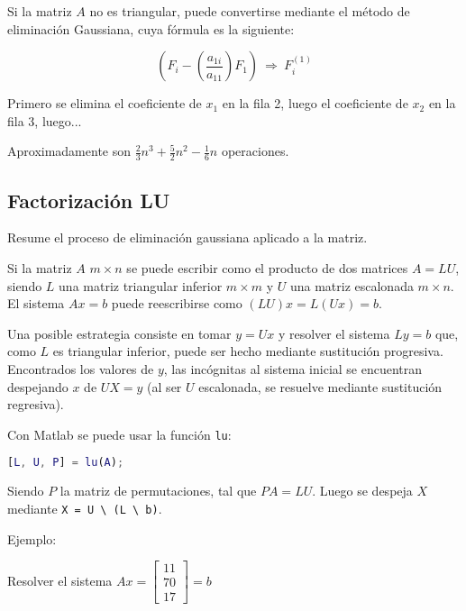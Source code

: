\documentclass{article}
\begin{document}
Si la matriz $A$ no es triangular, puede convertirse mediante el método de 
eliminación Gaussiana, cuya fórmula es la siguiente:

\begin{equation*}
\left( F_i - \left( \frac{a_{1i}}{a_{11}} \right) F_1 \right)\ \Rightarrow\ F_i^{(1)}
\end{equation*}

Primero se elimina el coeficiente de $x_1$ en la fila 2, luego el coeficiente de
$x_2$ en la fila 3, luego...

Aproximadamente son $\frac{2}{3}n^3+\frac{5}{2}n^2-\frac{1}{6}n$ operaciones.

\subsection{Factorización LU}

Resume el proceso de eliminación gaussiana aplicado a la matriz.

Si la matriz $A$ $m\times n$ se puede escribir como el producto de dos matrices 
$A=LU$, siendo $L$ una matriz triangular inferior $m\times m$ y $U$ una matriz
escalonada $m\times n$. El sistema $Ax=b$ puede reescribirse como 
$(LU)x=L(Ux)=b$.

Una posible estrategia consiste en tomar $y = Ux$ y resolver el sistema $Ly=b$
que, como $L$ es triangular inferior, puede ser hecho mediante sustitución
progresiva. Encontrados los valores de $y$, las incógnitas al sistema inicial
se encuentran despejando $x$ de $UX=y$ (al ser $U$ escalonada, se resuelve 
mediante sustitución regresiva).

Con Matlab se puede usar la función \verb|lu|:

\begin{lstlisting}[language=Matlab]
[L, U, P] = lu(A);
\end{lstlisting}

Siendo $P$ la matriz de permutaciones, tal que $PA=LU$. Luego se despeja $X$ 
mediante \verb|X = U \ (L \ b)|.

Ejemplo:

Resolver el sistema $Ax=\begin{bmatrix}11 \\ 70 \\ 17\end{bmatrix}=b$
\end{document}

